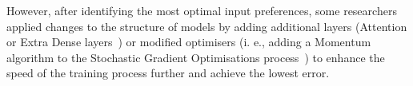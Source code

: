 However, after identifying the most optimal input preferences, some researchers applied changes to the structure of models by adding additional layers (Attention or Extra Dense layers~\cite{mamo_long_2020, jiao_gru-rnn_2020}) or modified optimisers (i. e., adding a Momentum algorithm to the Stochastic Gradient Optimisations process~\cite{xiao_accurate_2019}) to enhance the speed of the training process further and achieve the lowest error.
